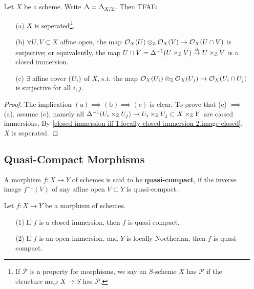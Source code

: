 \begin{proposition}\label{seperated is Zariski global}
    Let $X$ be a scheme. Write $\Delta = \Delta_{X/\mathbb{Z}}$.
    Then TFAE:
    \begin{enumerate}
\item [(a)] $X$ is seperated\footnote{If $\mathcal{P}$ is a property for morphisms, we say an $S$-scheme $X$ has $\mathcal{P}$ if the structure map $X\to S$ has $\mathcal{P}$.}.
\item [(b)] $\forall U, V\subset X$ affine open,
the map $\mathcal{O}_X(U)\otimes_{\mathbb{Z}} \mathcal{O}_X(V)\to \mathcal{O}_X(U\cap V)$ is surjective;
or equivalently, the map
$U\cap V = \Delta^{-1}(U\times_{\mathbb{Z}} V)\stackrel{\Delta}{\to} U\times_{\mathbb{Z}} V$ is a closed immersion.
\item [(c)] $\exists$ affine cover $\{U_i\}$ of $X$,
s.t. the map $\mathcal{O}_X(U_i)\otimes_{\mathbb{Z}}\mathcal{O}_X(U_j)\to \mathcal{O}_X(U_i\cap U_j)$ is surjective for all $i, j$.
\end{enumerate}
\end{proposition}
\begin{proof}
    The implication $(\mathrm{a})\implies(\mathrm{b})\implies(\mathrm{c})$ is clear.
    To prove that (c) $\implies$ (a), assume (c), namely all $\Delta^{-1}(U_i\times_{\mathbb{Z}} U_j)\to U_i\times_{\mathbb{Z}} U_j\subset X\times_{\mathbb{Z}} Y$ are closed immersions.
    By \cref{closed immersion iff 1.locally closed immersion 2.image closed}, $X$ is seperated.


\end{proof}

\subsection{Quasi-Compact Morphisms}
A morphism $f: X\to Y$ of schemes is said to be
\textbf{quasi-compact}, if the inverse image $f^{-1}(V)$ of any affine open $V\subset Y$ is quasi-compact.
\begin{proposition}
    Let $f : X\to Y$ be a morphism of schemes.
    \begin{enumerate}
    \item [(1)] If $f$ is a closed immersion, then $f$ is quasi-compact.
    \item [(2)] If $f$ is an open immersion, and $Y$ is locally Noetherian, then $f$ is quasi-compact.
    \end{enumerate}
\end{proposition}


